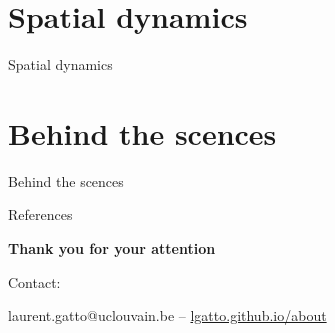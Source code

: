 \documentclass{beamer}
\theoremstyle{example}
\begin{document}

\section{Spatial dynamics}


\begin{frame}{Spatial dynamics}

\end{frame}



\section{Behind the scences}


\begin{frame}{Behind the scences}

\end{frame}




\begin{frame}[allowframebreaks]{References}
  \scriptsize
  
  
\end{frame}



\begin{frame}%

\vspace{.1cm}



\begin{center}
  \textbf{Thank you for your attention}
\end{center}


\bigskip

Contact:

\begin{center}
  laurent.gatto@uclouvain.be – \url{lgatto.github.io/about}
\end{center}
 
\end{frame}
\end{document}
